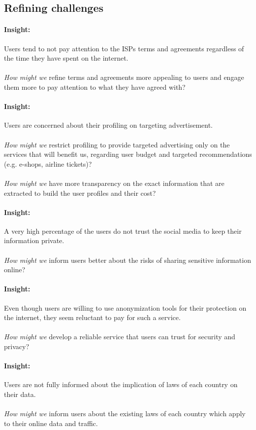 \subsection{Refining challenges}
\label{section_4}

\paragraph{Insight: } 
Users tend to not pay attention to the ISPs terms and agreements regardless of 
the time they have spent on the internet. \\
\\\emph{How might we } 
refine terms and agreements more appealing to users and engage them more to pay 
attention to what they have agreed with?

\paragraph{Insight: }
Users are concerned about their profiling on targeting advertisement. \\
\\\emph{How might we }
restrict profiling to provide targeted advertising only on the services that 
will benefit us, regarding user budget and targeted recommendations (e.g. 
e-shops, airline tickets)?\\
\\\emph{How might we }
have more transparency on the exact information that are extracted to build the 
user profiles and their cost?

\paragraph{Insight: }
A very high percentage of the users do not trust the social media to keep their 
information private.\\
\\\emph{How might we }
inform users better about the risks of sharing sensitive information online?

\paragraph{Insight: }
Even though users are willing to use anonymization tools for their protection on 
the internet, they seem reluctant to pay for such a service.\\
\\\emph{How might we }
develop a reliable service that users can trust for security and privacy?

\paragraph{Insight: }
Users are not fully informed about the implication of laws of each country on 
their data.\\
\\\emph{How might we }
inform users about the existing laws of each country which apply to their online 
data and traffic.

